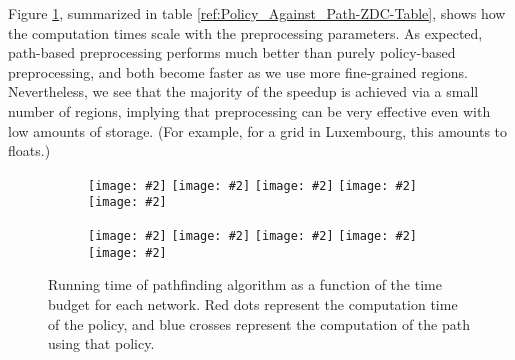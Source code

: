 \documentclass[oribibl]{llncs}
\newcommand{\includepdfplot}[2][]{\begingroup\texttt{[image: \#2]}\endgroup}
\begin{document}
			Figure \ref{ref:Policy_Against_Path-ZDC},
			summarized in table \ref{ref:Policy_Against_Path-ZDC-Table},
			shows how the computation times scale with the preprocessing parameters.
			As expected, path-based preprocessing performs much better than purely policy-based preprocessing,
			and both become faster as we use more fine-grained regions.
			Nevertheless, we see that the majority of the speedup is achieved via a small number of regions,
			implying that preprocessing can be very effective even with low amounts of storage.
			(For example, for a  grid in Luxembourg, this amounts to
			 floats.)
			\begin{figure}[H]
				\centering
				\begin{subfigure}[t]{0.512\textwidth}
					\centering
					\includepdfplot[width=\textwidth]{Preprocessing-ZDC-SF-NoSource-0-Log.pdf}
					\includepdfplot[width=\textwidth]{Preprocessing-ZDC-SF-NoSource-100-Log.pdf}
					\includepdfplot[width=\textwidth]{Preprocessing-ZDC-SF-NoSource-676-Log.pdf}
					\includepdfplot[width=\textwidth]{Preprocessing-ZDC-SF-WithSource-100-Log.pdf}
					\includepdfplot[width=\textwidth]{Preprocessing-ZDC-SF-WithSource-676-Log.pdf}
				\end{subfigure}
				\begin{subfigure}[t]{0.478\textwidth}
					\centering
					\includepdfplot[width=\textwidth]{Preprocessing-ZDC-Luxembourg-NoSource-0-Log.pdf}
					\includepdfplot[width=\textwidth]{Preprocessing-ZDC-Luxembourg-NoSource-289-Log.pdf}
					\includepdfplot[width=\textwidth]{Preprocessing-ZDC-Luxembourg-NoSource-1156-Log.pdf}
					\includepdfplot[width=\textwidth]{Preprocessing-ZDC-Luxembourg-WithSource-289-Log.pdf}
					\includepdfplot[width=\textwidth]{Preprocessing-ZDC-Luxembourg-WithSource-1156-Log.pdf}
				\end{subfigure}
				\caption
				{
					Running time of pathfinding algorithm as a function of the time budget for each
					network. Red dots represent the computation time of the policy,
					and blue crosses represent the computation of the path using that policy.
				}
				\label{ref:Policy_Against_Path-ZDC}
			\end{figure}
\end{document}
